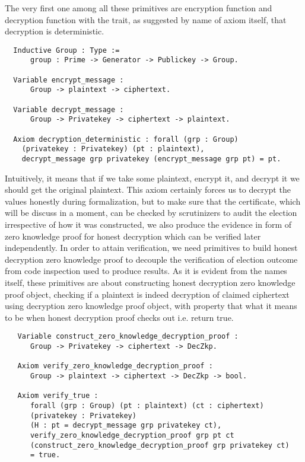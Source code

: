 \documentclass{llncs}
\begin{document}
 The very first one among all these primitives 
are encryption function and decryption function with the trait, as suggested 
by name of axiom itself, that decryption is deterministic. 

\begin{verbatim}
  Inductive Group : Type :=
      group : Prime -> Generator -> Publickey -> Group. 

  Variable encrypt_message :
      Group -> plaintext -> ciphertext.
      
  Variable decrypt_message :
      Group -> Privatekey -> ciphertext -> plaintext.
 
  Axiom decryption_deterministic : forall (grp : Group) 
    (privatekey : Privatekey) (pt : plaintext), 
    decrypt_message grp privatekey (encrypt_message grp pt) = pt.
 \end{verbatim}
 
 Intuitively, it means that if we take some plaintext, encrypt it, and decrypt it 
 we should get the original plaintext. This axiom certainly forces us to decrypt
  the values 
 honestly during formalization, but to make sure that the certificate, which 
 will be discuss in a moment, can be checked 
 by scrutinizers to audit the election irrespective of how it was constructed, 
 we also produce the evidence in form of zero knowledge proof for honest decryption which
 can be verified later independently. In order to attain verification, 
 we need primitives to build 
 honest decryption zero knowledge proof to decouple the verification of election 
 outcome from code inspection used to produce results.
 As it is evident from the names itself, these primitives are about constructing honest
 decryption zero knowledge proof object, checking if a plaintext is indeed 
 decryption of claimed ciphertext using decryption zero knowledge proof object, 
 with property that what it means to be when honest decryption proof 
 checks out i.e. return true.
 
 \begin{verbatim}
   Variable construct_zero_knowledge_decryption_proof :
      Group -> Privatekey -> ciphertext -> DecZkp.

   Axiom verify_zero_knowledge_decryption_proof :
      Group -> plaintext -> ciphertext -> DecZkp -> bool. 
   
   Axiom verify_true :
      forall (grp : Group) (pt : plaintext) (ct : ciphertext) 
      (privatekey : Privatekey)
      (H : pt = decrypt_message grp privatekey ct),
      verify_zero_knowledge_decryption_proof grp pt ct
      (construct_zero_knowledge_decryption_proof grp privatekey ct) 
      = true.
 \end{verbatim}
 
\end{document}
